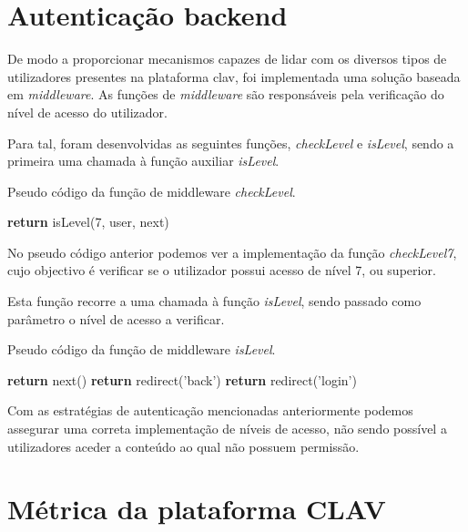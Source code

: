 \cleardoublepage
\section{Autenticação backend}

De modo a proporcionar mecanismos capazes de lidar com os diversos tipos de utilizadores presentes na plataforma \gls{clav}, foi implementada uma solução baseada em \emph{middleware}. As funções de \emph{middleware} são responsáveis pela verificação do nível de acesso do utilizador. 

Para tal, foram desenvolvidas as seguintes funções, \emph{checkLevel} e \emph{isLevel}, sendo a primeira uma chamada à função auxiliar \emph{isLevel}.

\begin{algorithm}
    \caption{Pseudo código da função de middleware \emph{checkLevel}.}
    \begin{algorithmic}[1]
            \State \textbf{return} isLevel(7, user, next)
    \EndFunction
    \end{algorithmic}
\end{algorithm}

No pseudo código anterior podemos ver a implementação da função \emph{checkLevel7}, cujo objectivo é verificar se o utilizador possui acesso de nível 7, ou superior.

Esta função recorre a uma chamada à função \emph{isLevel}, sendo passado como parâmetro o nível de acesso a verificar.

\begin{algorithm}
    \caption{Pseudo código da função de middleware \emph{isLevel}.}
    \begin{algorithmic}[1]
                \State \textbf{return} next()
            \Else
                \State \textbf{return} redirect('back')
            \EndIf
        \Else
            \State \textbf{return} redirect('login')
        \EndIf
    \EndFunction
    \end{algorithmic}
\end{algorithm}

Com as estratégias de autenticação mencionadas anteriormente podemos assegurar uma correta implementação de níveis de acesso, não sendo possível a utilizadores aceder a conteúdo ao qual não possuem permissão.

\section{Métrica da plataforma CLAV}